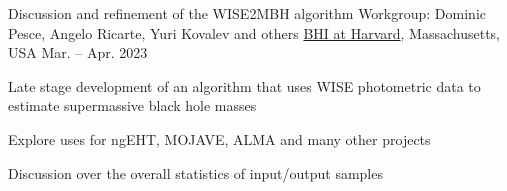 
\begin{cventries}

  \cventry
    {Discussion and refinement of the WISE2MBH algorithm}
    {Workgroup: Dominic Pesce, Angelo Ricarte, Yuri Kovalev and others}
    {\href{https://bhi.fas.harvard.edu/}{BHI at Harvard}, Massachusetts, USA}
    {Mar. -- Apr. 2023}
    {
      \begin{cvitems}
        \item{Late stage development of an algorithm that uses WISE photometric data to estimate supermassive black hole masses}
        \item{Explore uses for ngEHT, MOJAVE, ALMA and many other projects}
        \item{Discussion over the overall statistics of input/output samples}
      \end{cvitems}
    }
    

\end{cventries}

